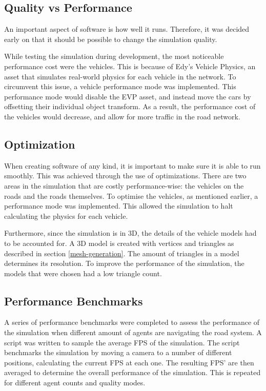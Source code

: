     \subsection{Quality vs Performance}
        An important aspect of software is how well it runs. Therefore, it was decided early on that it should be possible to change the simulation quality.
    
        While testing the simulation during development, the most noticeable performance cost were the vehicles. This is because of Edy's Vehicle Physics, an asset that simulates real-world physics for each vehicle in the network. To circumvent this issue, a vehicle performance mode was implemented. This performance mode would disable the EVP asset, and instead move the cars by offsetting their individual object transform. As a result, the performance cost of the vehicles would decrease, and allow for more traffic in the road network.
    
    \subsection{Optimization} 
        When creating software of any kind, it is important to make sure it is able to run smoothly. This was achieved through the use of optimizations. There are two areas in the simulation that are costly performance-wise: the vehicles on the roads and the roads themselves. To optimise the vehicles, as mentioned earlier, a performance mode was implemented. This allowed the simulation to halt calculating the physics for each vehicle. 
    
        Furthermore, since the simulation is in 3D, the details of the vehicle models had to be accounted for. A 3D model is created with vertices and triangles as described in section \ref{mesh-generation}. The amount of triangles in a model determines its resolution. To improve the performance of the simulation, the models that were chosen had a low triangle count.

    \subsection{Performance Benchmarks} \label{performance-method}
        A series of performance benchmarks were completed to assess the performance of the simulation when different amount of agents are navigating the road system. A script was written to sample the average FPS of the simulation. The script benchmarks the simulation by moving a camera to a number of different positions, calculating the current FPS at each one. The resulting FPS' are then averaged to determine the overall performance of the simulation. This is repeated for different agent counts and quality modes. 

